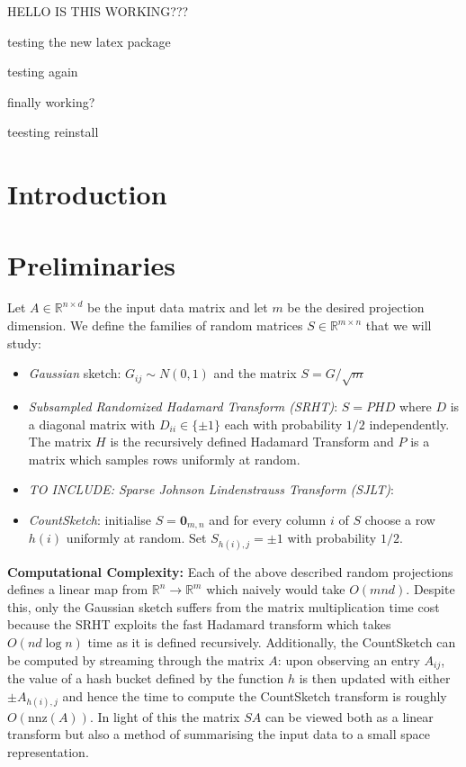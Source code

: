 \documentclass[twoside]{article}
\newcommand{\R}{\mathbb{R}}
\newcommand{\nnz}[1]{\text{nnz}(#1)}
\theoremstyle{definition}\newtheorem{thm}{Theorem}[section]
\theoremstyle{definition}\newtheorem{mydef}[thm]{Definition}
\theoremstyle{definition}\newtheorem{rem}[thm]{Remark}
\theoremstyle{definition}\newtheorem{prop}[thm]{Proposition}
\theoremstyle{definition}\newtheorem{example}[thm]{Example}
\theoremstyle{definition}\newtheorem{claim}[thm]{Claim}
\theoremstyle{definition}\newtheorem{Qu}[thm]{Question}
\theoremstyle{definition}\newtheorem{Lemma}[thm]{Lemma}
\theoremstyle{definition}\newtheorem{Cor}[thm]{Corollary}
\theoremstyle{definition}\newtheorem{Fact}[]{Fact}
\begin{document}
HELLO IS THIS WORKING???

testing the new latex package

testing again

finally working?

teesting reinstall 
\section{Introduction} \label{sec: intro}



\section{Preliminaries} \label{sec: preliminaries}

Let $A \in \R^{n \times d}$ be the input data matrix and let $m$ be the
desired projection dimension.
We define the families of random matrices $S \in \R^{m \times n}$ that we will
study:
\begin{itemize}
  \item \textit{Gaussian} sketch: $G_{ij} \sim N(0,1)$ and the matrix
  $S = G/\sqrt{m}$
  \item \textit{Subsampled Randomized Hadamard Transform (SRHT)}: $S = PHD$
  where $D$ is a diagonal matrix with $D_{ii} \in \{ \pm 1 \}$ each with
  probability $1/2$ independently.
  The matrix $H$ is the recursively defined Hadamard Transform and $P$ is
  a matrix
  which samples rows uniformly at random.
  \item{\textit{TO INCLUDE: Sparse Johnson Lindenstrauss Transform (SJLT)}:}
  \item \textit{CountSketch}: initialise $S = \mathbf{0}_{m,n}$ and for every
  column $i$ of $S$ choose a row $h(i)$ uniformly at random.
  Set $S_{h(i),j} = \pm 1$ with probability $1/2$.
\end{itemize}

\textbf{Computational Complexity:}
Each of the above described random projections defines a linear map from $\R^n
\to \R^m$ which naively would take $O(mnd)$.
Despite this, only the Gaussian sketch suffers from the matrix multiplication
time cost because the SRHT exploits the fast Hadamard transform which takes
$O(nd \log n)$ time as it is defined recursively.
Additionally, the CountSketch can be computed by streaming through the matrix
$A$: upon observing an entry $A_{ij}$, the value of a hash bucket defined
by the function $h$ is then updated with either $\pm A_{h(i),j}$ and hence
the time
to compute the CountSketch transform is roughly $O(\nnz{A})$.
In light of this the matrix $SA$ can be viewed both as a linear transform but
also a method of summarising the input data to a small space representation.
\end{document}
